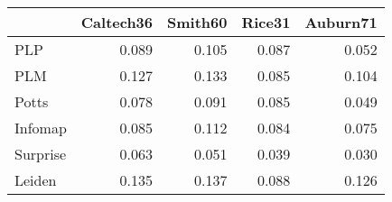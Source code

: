 \begin{tabular}{lrrrr}
\toprule
{} & Caltech36 & Smith60 & Rice31 & Auburn71 \\
\midrule
PLP      &     0.089 &   0.105 &  0.087 &    0.052 \\
PLM      &     0.127 &   0.133 &  0.085 &    0.104 \\
Potts    &     0.078 &   0.091 &  0.085 &    0.049 \\
Infomap  &     0.085 &   0.112 &  0.084 &    0.075 \\
Surprise &     0.063 &   0.051 &  0.039 &    0.030 \\
Leiden   &     0.135 &   0.137 &  0.088 &    0.126 \\
\bottomrule
\end{tabular}
